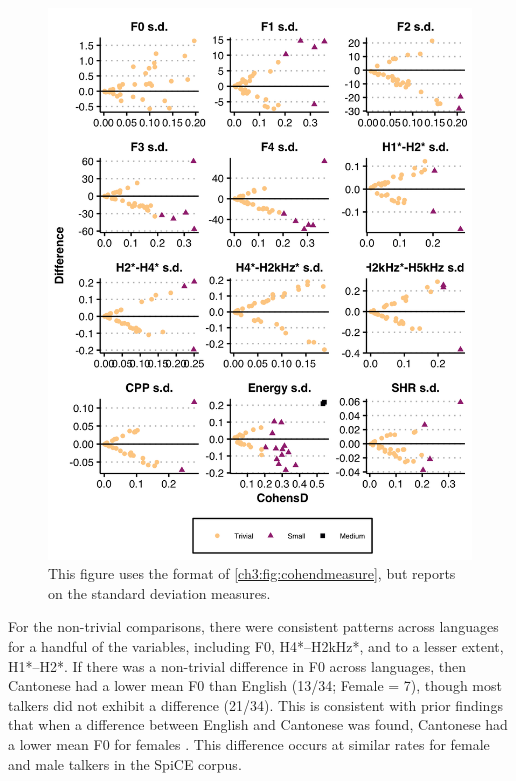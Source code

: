 \begin{figure}[htbp]
    \begin{center}
    \includegraphics[width=0.9\linewidth]{figures/ch3_cohend_part2_5in.png} 
    \caption{This figure uses the format of \ref{ch3:fig:cohendmeasure}, but reports on the standard deviation measures.}
    \label{ch3:fig:cohendsd}
    \end{center}
\end{figure}

For the non-trivial comparisons, there were consistent patterns across languages for a handful of the variables, including F0, H4*--H2kHz*, and to a lesser extent, H1*--H2*. If there was a non-trivial difference in F0 across languages, then Cantonese had a lower mean F0 than English (13/34; Female = 7), though most talkers did not exhibit a difference (21/34). This is consistent with prior findings that when a difference between English and Cantonese was found, Cantonese had a lower mean F0 for females \citep{ng_2012_ltas,altenberg_2006_f0}. This difference occurs at similar rates for female and male talkers in the SpiCE corpus.

